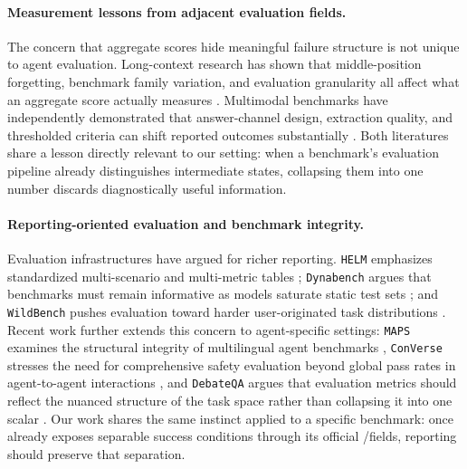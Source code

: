 \paragraph{Measurement lessons from adjacent evaluation fields.}
The concern that aggregate scores hide meaningful failure structure is not
unique to agent evaluation. Long-context research has shown that
middle-position forgetting, benchmark family variation, and evaluation
granularity all affect what an aggregate score actually measures
\cite{lostmiddle,longbench,ruler,infinitebench,nolima,loogle}. Multimodal
benchmarks have independently demonstrated that answer-channel design,
extraction quality, and thresholded criteria can shift reported outcomes
substantially \cite{mme,mmmu,mathvista,hallusionbench,blink}. Both literatures
share a lesson directly relevant to our setting: when a benchmark's evaluation
pipeline already distinguishes intermediate states, collapsing them into one
number discards diagnostically useful information.

\paragraph{Reporting-oriented evaluation and benchmark integrity.}
Evaluation infrastructures have argued for richer reporting. \texttt{HELM}
emphasizes standardized multi-scenario and multi-metric tables \cite{helm};
\texttt{Dynabench} argues that benchmarks must remain informative as models
saturate static test sets \cite{dynabench}; and \texttt{WildBench} pushes
evaluation toward harder user-originated task distributions \cite{wildbench}.
Recent work further extends this concern to agent-specific settings:
\texttt{MAPS} examines the structural integrity of multilingual agent
benchmarks \cite{maps}, \texttt{ConVerse} stresses the need for comprehensive
safety evaluation beyond global pass rates in agent-to-agent interactions
\cite{converse}, and \texttt{DebateQA} argues that evaluation metrics should
reflect the nuanced structure of the task space rather than collapsing it into
one scalar \cite{debateqa}.
Our work shares the same instinct applied to a specific benchmark: once
\gittaskbench already exposes separable success conditions through its official
\processmetric/\resultmetric fields, reporting should preserve that separation.
